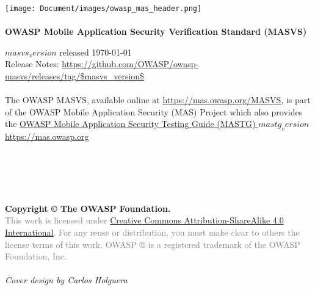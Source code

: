\thispagestyle{empty} %

\texttt{[image: Document/images/owasp\_mas\_header.png]} \\ \\

\textbf{OWASP Mobile Application Security Verification Standard (MASVS)}

$masvs_version$ released \today \\

Release Notes: \url{https://github.com/OWASP/owasp-masvs/releases/tag/$masvs_version$} \\ \\


The OWASP MASVS, available online at \url{https://mas.owasp.org/MASVS}, is part of the OWASP Mobile Application Security (MAS) Project which also provides the \href{https://mas.owasp.org/MASTG}{OWASP Mobile Application Security Testing Guide (MASTG) $mastg_version$} \\

\url{https://mas.owasp.org} \\ \\ \\ \\ \\ \\

\textbf{Copyright © The OWASP Foundation.} \\

\textcolor{gray}{This work is licensed under \href{https://creativecommons.org/licenses/by-sa/4.0/}{Creative Commons Attribution-ShareAlike 4.0 International}. For any reuse or distribution, you must make clear to others the license terms of this work.
OWASP ® is a registered trademark of the OWASP Foundation, Inc.} \\ \\


\emph{Cover design by Carlos Holguera}